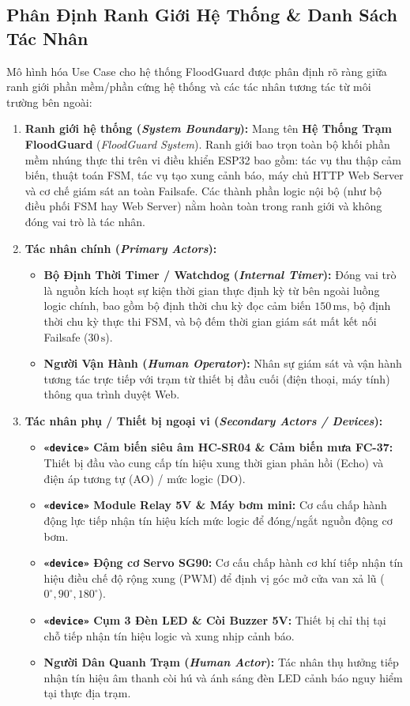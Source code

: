 \subsection{Phân Định Ranh Giới Hệ Thống \& Danh Sách Tác Nhân}
Mô hình hóa Use Case cho hệ thống FloodGuard được phân định rõ ràng giữa ranh giới phần mềm/phần cứng hệ thống và các tác nhân tương tác từ môi trường bên ngoài:
\begin{enumerate}
    \item \textbf{Ranh giới hệ thống (\textit{System Boundary}):} Mang tên \textbf{Hệ Thống Trạm FloodGuard} (\textit{FloodGuard System}). Ranh giới bao trọn toàn bộ khối phần mềm nhúng thực thi trên vi điều khiển ESP32 bao gồm: tác vụ thu thập cảm biến, thuật toán FSM, tác vụ tạo xung cảnh báo, máy chủ HTTP Web Server và cơ chế giám sát an toàn Failsafe. Các thành phần logic nội bộ (như bộ điều phối FSM hay Web Server) nằm hoàn toàn trong ranh giới và không đóng vai trò là tác nhân.
    \item \textbf{Tác nhân chính (\textit{Primary Actors}):}
    \begin{itemize}
        \item \textbf{Bộ Định Thời Timer / Watchdog (\textit{Internal Timer}):} Đóng vai trò là nguồn kích hoạt sự kiện thời gian thực định kỳ từ bên ngoài luồng logic chính, bao gồm bộ định thời chu kỳ đọc cảm biến $150\,\text{ms}$, bộ định thời chu kỳ thực thi FSM, và bộ đếm thời gian giám sát mất kết nối Failsafe ($30\,\text{s}$).
        \item \textbf{Người Vận Hành (\textit{Human Operator}):} Nhân sự giám sát và vận hành tương tác trực tiếp với trạm từ thiết bị đầu cuối (điện thoại, máy tính) thông qua trình duyệt Web.
    \end{itemize}
    \item \textbf{Tác nhân phụ / Thiết bị ngoại vi (\textit{Secondary Actors / Devices}):}
    \begin{itemize}
        \item \textbf{\texttt{«device»} Cảm biến siêu âm HC-SR04 \& Cảm biến mưa FC-37:} Thiết bị đầu vào cung cấp tín hiệu xung thời gian phản hồi (Echo) và điện áp tương tự (AO) / mức logic (DO).
        \item \textbf{\texttt{«device»} Module Relay 5V \& Máy bơm mini:} Cơ cấu chấp hành động lực tiếp nhận tín hiệu kích mức logic để đóng/ngắt nguồn động cơ bơm.
        \item \textbf{\texttt{«device»} Động cơ Servo SG90:} Cơ cấu chấp hành cơ khí tiếp nhận tín hiệu điều chế độ rộng xung (PWM) để định vị góc mở cửa van xả lũ ($0^\circ, 90^\circ, 180^\circ$).
        \item \textbf{\texttt{«device»} Cụm 3 Đèn LED \& Còi Buzzer 5V:} Thiết bị chỉ thị tại chỗ tiếp nhận tín hiệu logic và xung nhịp cảnh báo.
        \item \textbf{Người Dân Quanh Trạm (\textit{Human Actor}):} Tác nhân thụ hưởng tiếp nhận tín hiệu âm thanh còi hú và ánh sáng đèn LED cảnh báo nguy hiểm tại thực địa trạm.
    \end{itemize}
\end{enumerate}

